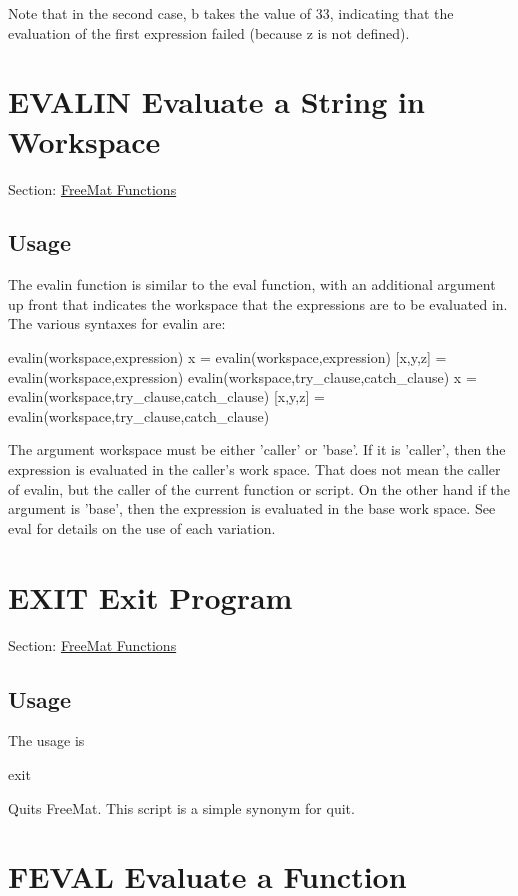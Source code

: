 Note that in the second case, {\ttfamily b} takes the value of 33, indicating that the evaluation of the first expression failed (because {\ttfamily z} is not defined). \hypertarget{freemat_evalin}{}\section{E\-V\-A\-L\-I\-N Evaluate a String in Workspace}\label{freemat_evalin}
Section\-: \hyperlink{sec_freemat}{Free\-Mat Functions} \hypertarget{vtkwidgets_vtkxyplotwidget_Usage}{}\subsection{Usage}\label{vtkwidgets_vtkxyplotwidget_Usage}
The {\ttfamily evalin} function is similar to the {\ttfamily eval} function, with an additional argument up front that indicates the workspace that the expressions are to be evaluated in. The various syntaxes for {\ttfamily evalin} are\-: \begin{DoxyVerb}   evalin(workspace,expression)
   x = evalin(workspace,expression)
   [x,y,z] = evalin(workspace,expression)
   evalin(workspace,try_clause,catch_clause)
   x = evalin(workspace,try_clause,catch_clause)
   [x,y,z] = evalin(workspace,try_clause,catch_clause)
\end{DoxyVerb}
 The argument {\ttfamily workspace} must be either 'caller' or 'base'. If it is 'caller', then the expression is evaluated in the caller's work space. That does not mean the caller of {\ttfamily evalin}, but the caller of the current function or script. On the other hand if the argument is 'base', then the expression is evaluated in the base work space. See {\ttfamily eval} for details on the use of each variation. \hypertarget{freemat_exit}{}\section{E\-X\-I\-T Exit Program}\label{freemat_exit}
Section\-: \hyperlink{sec_freemat}{Free\-Mat Functions} \hypertarget{vtkwidgets_vtkxyplotwidget_Usage}{}\subsection{Usage}\label{vtkwidgets_vtkxyplotwidget_Usage}
The usage is \begin{DoxyVerb}   exit
\end{DoxyVerb}
 Quits Free\-Mat. This script is a simple synonym for {\ttfamily quit}. \hypertarget{freemat_feval}{}\section{F\-E\-V\-A\-L Evaluate a Function}\label{freemat_feval}
